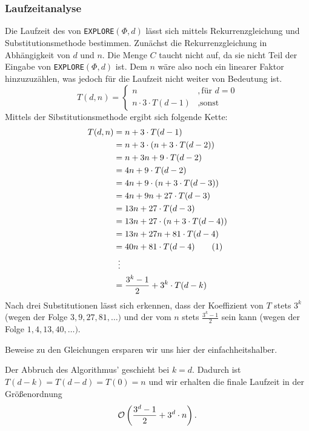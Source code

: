 \documentclass[a4paper]{article}
\newcommand{\explore}{\texttt{EXPLORE$(\Phi, d)$}\xspace}
\begin{document}
	\maketitle
	\section{}
	\section{}
	\subsubsection{}
	
	\subsubsection*{Laufzeitanalyse}
	Die Laufzeit des von \explore lässt sich mittels Rekurrenzgleichung und Substitutionsmethode bestimmen.\n
	Zunächst die Rekurrenzgleichung in Abhängigkeit von $d$ und $n$.
	Die Menge $C$ taucht nicht auf, da sie nicht Teil der Eingabe von \explore ist. Dem $n$ wäre also noch ein linearer Faktor hinzuzuzählen, was jedoch für die Laufzeit nicht weiter von Bedeutung ist.
	\[
		T(d, n)=
		\begin{cases}
			n					& , \text{für } d=0\\
			n\cdot 3\cdot T(d-1)		& , \text{sonst}
		\end{cases}
	\]
	Mittels der Sibstitutionsmethode ergibt sich folgende Kette:
	\begin{align*}
		T(d, n)	&=		n+3		\cdot 						T(d-1)			\\
				&=		n+3		\cdot 	(	n+3		\cdot 	T(d-2))			\\
				&=		n+3			 		n+9		\cdot 	T(d-2)			\\
				&=	4 	n+9		\cdot 						T(d-2)			\\
				&=	4 	n+9		\cdot	(	n+3		\cdot 	T(d-3))			\\
				&=	4	n+9					n+27	\cdot	T(d-3)			\\
				&=	13	n+27	\cdot						T(d-3)			\\
				&=	13	n+27	\cdot	(	n+3		\cdot	T(d-4))			\\
				&=	13	n+27				n+81	\cdot	T(d-4)			\\
				&=	40	n+81	\cdot						T(d-4)	\tag{1}	\\
				&\makebox[\widthof{${}={}$}][c]{\vdots}					\\
				&=\frac{3^k-1}{2}+3^k\cdot T(d-k)
	\end{align*}
	Nach drei Substitutionen lässt sich erkennen, dass der Koeffizient von $T$ stets $3^k$ (wegen der Folge $3, 9, 27, 81, \dots)$ und der vom $n$ stets $\frac{3^k-1}{2}$ sein kann (wegen der Folge $1, 4, 13, 40, \dots)$.
	\begin{note}
	Beweise zu den Gleichungen ersparen wir uns hier der einfachheitshalber.
	\end{note}
	Der Abbruch des Algorithmus' geschieht bei $k=d$.
	Dadurch ist $T(d-k)=T(d-d)=T(0)=n$ und wir erhalten die finale Laufzeit in der Größenordnung
	\[
		\mathcal{O}\left(\frac{3^d-1}{2}+3^d\cdot n\right).
	\]
\end{document}
